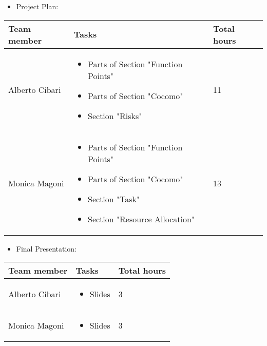 \newpage
\begin{itemize}
    \item Project Plan:
\end{itemize}
\begin{table}[H]
    \centering
    \begin{tabular}{|l|p{8cm}|l|}
        \hline
        \textbf{Team member} & \textbf{Tasks} & \textbf{Total hours}\\
        \hline
        Alberto Cibari & \begin{itemize}
            \item Parts of Section "Function Points"
            \item Parts of Section "Cocomo"
            \item Section "Risks"
        \end{itemize} & 11\\
        \hline
        Monica Magoni & \begin{itemize}
            \item Parts of Section "Function Points"
            \item Parts of Section "Cocomo"
            \item Section "Task"
            \item Section "Resource Allocation"
        \end{itemize} & 13\\
        \hline
    \end{tabular}
\end{table}


\newpage
\begin{itemize}
    \item Final Presentation:
\end{itemize}
\begin{table}[H]
    \centering
    \begin{tabular}{|l|p{8cm}|l|}
        \hline
        \textbf{Team member} & \textbf{Tasks} & \textbf{Total hours}\\
        \hline
        Alberto Cibari & \begin{itemize}
            \item Slides
        \end{itemize} & 3\\
        \hline
        Monica Magoni & \begin{itemize}
            \item Slides
        \end{itemize} & 3\\
        \hline
    \end{tabular}
\end{table}



